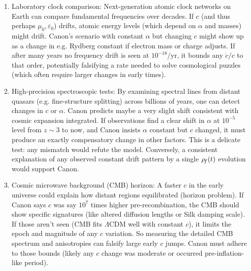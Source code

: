 \documentclass[11pt]{article}
\begin{document}
\begin{enumerate}

\item 
Laboratory clock comparison: Next-generation atomic clock networks on Earth can compare fundamental frequencies over decades. If $c$ (and thus perhaps $\mu_0,\varepsilon_0$) drifts, atomic energy levels (which depend on $\alpha$ and masses) might drift. Canon’s scenario with constant $\alpha$ but changing $c$ might show up as a change in e.g. Rydberg constant if electron mass or charge adjusts. If after many years no frequency drift is seen at $10^{-18}$/yr, it bounds any $\dot{c}/c$ to that order, potentially falsifying a rate needed to solve cosmological puzzles (which often require larger changes in early times).




\item 
High-precision spectroscopic tests: By examining spectral lines from distant quasars (e.g. fine-structure splitting) across billions of years, one can detect changes in $c$ or $\alpha$. Canon predicts maybe a very slight shift consistent with cosmic expansion integrated. If observations find a clear shift in $\alpha$ at $10^{-5}$ level from $z\sim3$ to now, and Canon insists $\alpha$ constant but $c$ changed, it must produce an exactly compensatory change in other factors. This is a delicate test: any mismatch would refute the model. Conversely, a consistent explanation of any observed constant drift pattern by a single $\rho_{\!f}(t)$ evolution would support Canon.




\item 
Cosmic microwave background (CMB) horizon: A faster $c$ in the early universe could explain how distant regions equilibrated (horizon problem). If Canon says $c$ was say $10^7$ times higher pre-recombination, the CMB should show specific signatures (like altered diffusion lengths or Silk damping scale). If those aren’t seen (CMB fits $\Lambda$CDM well with constant $c$), it limits the epoch and magnitude of any $c$ variation. So measuring the detailed CMB spectrum and anisotropies can falsify large early $c$ jumps. Canon must adhere to those bounds (likely any $c$ change was moderate or occurred pre-inflation-like period).




\end{enumerate}
\end{document}

